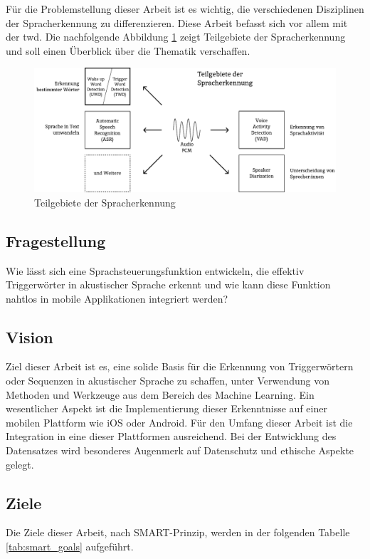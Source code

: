 \documentclass[11pt,a4paper]{article}
\begin{document}
\noindent \newline
Für die Problemstellung dieser Arbeit ist es wichtig, die verschiedenen Disziplinen der
Spracherkennung zu differenzieren. Diese Arbeit befasst sich vor allem mit der \gls{twd}. Die 
nachfolgende Abbildung \ref{fig:asr_twd} zeigt Teilgebiete der Spracherkennung und soll 
einen Überblick über die Thematik verschaffen. 

\vspace{1em}
\begin{figure}[h]
	\centering
	\includegraphics[width=1.0\linewidth]{img/asr_twd.pdf}
	\caption{Teilgebiete der Spracherkennung}
	\label{fig:asr_twd}

\end{figure}

\subsection{Fragestellung}
Wie lässt sich eine Sprachsteuerungsfunktion entwickeln, die effektiv Triggerwörter in akustischer 
Sprache erkennt und wie kann diese Funktion nahtlos in mobile Applikationen integriert werden?


\subsection{Vision}
Ziel dieser Arbeit ist es, eine solide Basis für die Erkennung von Triggerwörtern oder Sequenzen in 
akustischer Sprache zu schaffen, unter Verwendung von Methoden und Werkzeuge aus dem Bereich des 
Machine Learning. Ein wesentlicher Aspekt ist die Implementierung dieser Erkenntnisse auf einer 
mobilen Plattform wie iOS oder Android. Für den Umfang dieser Arbeit ist die Integration in eine 
dieser Plattformen ausreichend. Bei der Entwicklung des Datensatzes wird besonderes Augenmerk auf 
Datenschutz und ethische Aspekte gelegt.

\subsection{Ziele}
Die Ziele dieser Arbeit, nach SMART-Prinzip, werden in der folgenden Tabelle \ref{tab:smart_goals} aufgeführt.
\end{document}
